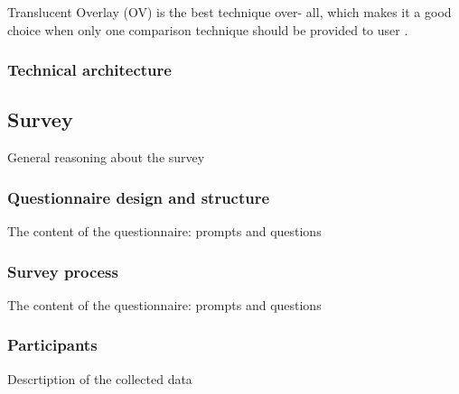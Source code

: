 Translucent Overlay (OV) is the best technique over-
all, which makes it a good choice when only one comparison
technique should be provided to user \parencite{lob2015}.








\subsubsection{Technical architecture}





\subsection{Survey}
General reasoning about the survey

\subsubsection{Questionnaire design and structure}
The content of the questionnaire: prompts and questions

\subsubsection{Survey process}
The content of the questionnaire: prompts and questions

\subsubsection{Participants}
Descrtiption of the collected data
